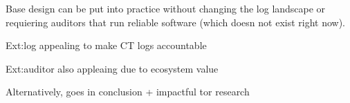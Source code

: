 Base design can be put into practice without changing the log landscape or
requiering auditors that run reliable software (which doesn not exist right
now).

Ext:log appealing to make CT logs accountable

Ext:auditor also appleaing due to ecosystem value

Alternatively, goes in conclusion + impactful tor research
